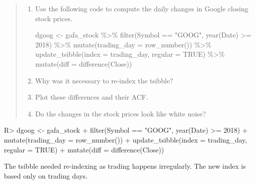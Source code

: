 \documentclass[
]{article}
\newenvironment{Shaded}{\begin{snugshade}}{\end{snugshade}}
\newcommand{\AttributeTok}[1]{\textcolor[rgb]{0.77,0.63,0.00}{#1}}
\newcommand{\ConstantTok}[1]{\textcolor[rgb]{0.00,0.00,0.00}{#1}}
\newcommand{\DecValTok}[1]{\textcolor[rgb]{0.00,0.00,0.81}{#1}}
\newcommand{\FunctionTok}[1]{\textcolor[rgb]{0.00,0.00,0.00}{#1}}
\newcommand{\NormalTok}[1]{#1}
\newcommand{\OtherTok}[1]{\textcolor[rgb]{0.56,0.35,0.01}{#1}}
\newcommand{\SpecialCharTok}[1]{\textcolor[rgb]{0.00,0.00,0.00}{#1}}
\newcommand{\StringTok}[1]{\textcolor[rgb]{0.31,0.60,0.02}{#1}}
\begin{document}
\begin{quote}
\begin{enumerate}
\def\labelenumi{\alph{enumi}.}
\item
  Use the following code to compute the daily changes in Google closing stock prices.

\begin{Shaded}
\begin{Highlighting}[]
\NormalTok{dgoog }\OtherTok{\textless{}{-}}\NormalTok{ gafa\_stock }\SpecialCharTok{\%\textgreater{}\%}
  \FunctionTok{filter}\NormalTok{(Symbol }\SpecialCharTok{==} \StringTok{"GOOG"}\NormalTok{, }\FunctionTok{year}\NormalTok{(Date) }\SpecialCharTok{\textgreater{}=} \DecValTok{2018}\NormalTok{) }\SpecialCharTok{\%\textgreater{}\%}
  \FunctionTok{mutate}\NormalTok{(}\AttributeTok{trading\_day =} \FunctionTok{row\_number}\NormalTok{()) }\SpecialCharTok{\%\textgreater{}\%}
  \FunctionTok{update\_tsibble}\NormalTok{(}\AttributeTok{index =}\NormalTok{ trading\_day, }\AttributeTok{regular =} \ConstantTok{TRUE}\NormalTok{) }\SpecialCharTok{\%\textgreater{}\%}
  \FunctionTok{mutate}\NormalTok{(}\AttributeTok{diff =} \FunctionTok{difference}\NormalTok{(Close))}
\end{Highlighting}
\end{Shaded}
\item
  Why was it necessary to re-index the tsibble?
\item
  Plot these differences and their ACF.
\item
  Do the changes in the stock prices look like white noise?
\end{enumerate}
\end{quote}

\begin{CodeChunk}
\begin{CodeInput}
R> dgoog <- gafa_stock %
+   filter(Symbol == "GOOG", year(Date) >= 2018) %
+   mutate(trading_day = row_number()) %
+   update_tsibble(index = trading_day, regular = TRUE) %
+   mutate(diff = difference(Close))
\end{CodeInput}
\end{CodeChunk}

The tsibble needed re-indexing as trading happens irregularly. The new index is based only on trading days.
\end{document}
